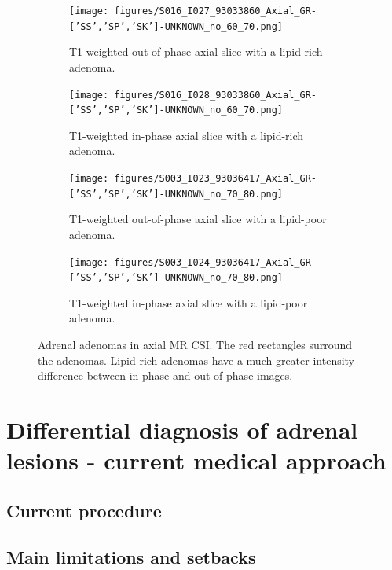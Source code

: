 \documentclass{article}
\begin{document}
\begin{figure}
    \centering
    \begin{subfigure}[b]{0.45\textwidth}
        \centering
        \texttt{[image: figures/S016\_I027\_93033860\_Axial\_GR-['SS','SP','SK']-UNKNOWN\_no\_60\_70.png]}
        \caption{T1-weighted out-of-phase axial slice with a lipid-rich adenoma.}
        \label{fig:adenoma_lr_OP}
    \end{subfigure}
    \hfill
    \begin{subfigure}[b]{0.45\textwidth}
        \centering
        \texttt{[image: figures/S016\_I028\_93033860\_Axial\_GR-['SS','SP','SK']-UNKNOWN\_no\_60\_70.png]}
        \caption{T1-weighted in-phase axial slice with a lipid-rich adenoma.}
        \label{fig:adenoma_lr_IP}
    \end{subfigure}
    \vfill
    \begin{subfigure}[b]{0.45\textwidth}
        \centering
        \texttt{[image: figures/S003\_I023\_93036417\_Axial\_GR-['SS','SP','SK']-UNKNOWN\_no\_70\_80.png]}
        \caption{T1-weighted out-of-phase axial slice with a lipid-poor adenoma.}
        \label{fig:adenoma_lp_OP}
    \end{subfigure}
    \hfill
    \begin{subfigure}[b]{0.45\textwidth}
        \centering
        \texttt{[image: figures/S003\_I024\_93036417\_Axial\_GR-['SS','SP','SK']-UNKNOWN\_no\_70\_80.png]}
        \caption{T1-weighted in-phase axial slice with a lipid-poor adenoma.}
        \label{fig:adenoma_lp_IP}
    \end{subfigure}
    \caption{Adrenal adenomas in axial MR CSI. The red rectangles surround the adenomas. Lipid-rich adenomas have a much greater intensity difference between in-phase and out-of-phase images.   }
    \label{fig:adenomas}
\end{figure}

\section{Differential diagnosis of adrenal lesions - current medical approach}

\subsection{Current procedure}

\subsection{Main limitations and setbacks}
\end{document}
